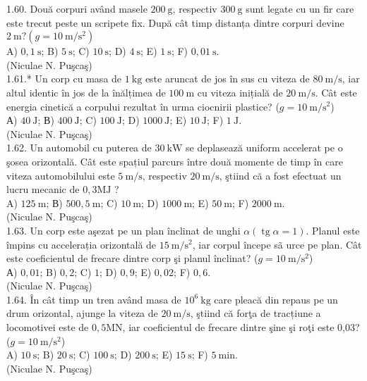 1.60. Două corpuri având masele $200 \mathrm{~g}$, respectiv $300 \mathrm{~g}$ sunt legate cu un fir care este trecut peste un scripete fix. După cât timp distanța dintre corpuri devine $2 \mathrm{~m}? (g=10 \mathrm{~m} / \mathrm{s}^{2})$\\ A) $0,1 \mathrm{~s}$; B) $5 \mathrm{~s}$; C) $10 \mathrm{~s}$; D) $4 \mathrm{~s}$; E) $1 \mathrm{~s}$; F) $0,01 \mathrm{~s}$.\\ (Niculae N. Puşcaş)\\

1.61.* Un corp cu masa de $1 \mathrm{~kg}$ este aruncat de jos în sus cu viteza de $80 \mathrm{~m} / \mathrm{s}$, iar altul identic în jos de la înălțimea de $100 \mathrm{~m}$ cu viteza inițială de $20 \mathrm{~m} / \mathrm{s}$. Cât este energia cinetică a corpului rezultat în urma ciocnirii plastice? ($g=10 \mathrm{~m} / \mathrm{s}^{2}$)\\ А) $40 \mathrm{~J}$; В) $400 \mathrm{~J}$; C) $100 \mathrm{~J}$; D) $1000 \mathrm{~J}$; E) $10 \mathrm{~J}$; F) $1 \mathrm{~J}$.\\ (Niculae N. Puşcaş)\\

1.62. Un automobil cu puterea de $30 \mathrm{~kW}$ se deplasează uniform accelerat pe o şosea orizontală. Cât este spațiul parcurs între două momente de timp în care viteza automobilului este $5 \mathrm{~m} / \mathrm{s}$, respectiv $20 \mathrm{~m} / \mathrm{s}$, ştiind că a fost efectuat un lucru mecanic de $0,3 \mathrm{MJ}$ ?\\ A) $125 \mathrm{~m}$; В) $500,5 \mathrm{~m}$; C) $10 \mathrm{~m}$; D) $1000 \mathrm{~m}$; E) $50 \mathrm{~m}$; F) $2000 \mathrm{~m}$.\\ (Niculae N. Puşcaş)\\

1.63. Un corp este aşezat pe un plan înclinat de unghi $\alpha (\operatorname{tg} \alpha=1)$. Planul este împins cu accelerația orizontală de $15 \mathrm{~m} / \mathrm{s}^{2}$, iar corpul începe sã urce pe plan. Cât este coeficientul de frecare dintre corp şi planul înclinat? ($g=10 \mathrm{~m} / \mathrm{s}^{2}$)\\ А) $0,01$; B) $0,2$; C) $1$; D) $0,9$; E) $0,02$; F) $0,6$.\\ (Niculae N. Puşcaş)\\

1.64. În cât timp un tren având masa de $10^{6} \mathrm{~kg}$ care pleacă din repaus pe un drum orizontal, ajunge la viteza de $20 \mathrm{~m} / \mathrm{s}$, ştiind că forţa de tracțiune a locomotivei este de $0,5 \mathrm{MN}$, iar coeficientul de frecare dintre şine şi roţi este 0,03? ($g=10 \mathrm{~m} / \mathrm{s}^{2}$)\\ A) $10 \mathrm{~s}$; B) $20 \mathrm{~s}$; C) $100 \mathrm{~s}$; D) $200 \mathrm{~s}$; E) $15 \mathrm{~s}$; F) $5 \mathrm{~min}$.\\ (Niculae N. Puşcaş)\\

